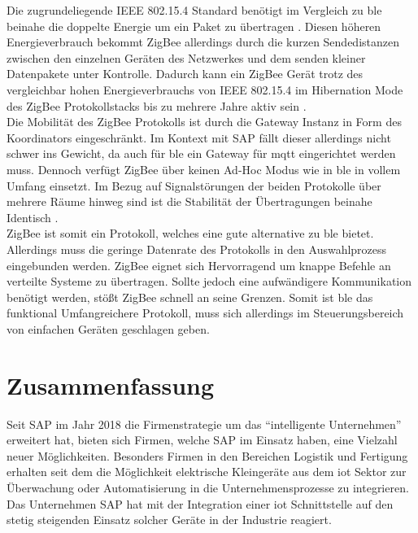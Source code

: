 \noindent Die zugrundeliegende IEEE 802.15.4 Standard benötigt im Vergleich zu \ac{ble} beinahe die doppelte Energie um ein Paket zu übertragen \cite[Seite 4]{Fafoutis16:BOI}. Diesen höheren Energieverbrauch bekommt ZigBee allerdings durch die kurzen Sendedistanzen zwischen den einzelnen Geräten des Netzwerkes und dem senden kleiner Datenpakete unter Kontrolle. Dadurch kann ein ZigBee Gerät trotz des vergleichbar hohen Energieverbrauchs von IEEE 802.15.4 im Hibernation Mode des ZigBee Protokollstacks bis zu mehrere Jahre aktiv sein \cite[Seite 267]{Gessler15:WNN}.\\

\noindent Die Mobilität des ZigBee Protokolls ist durch die Gateway Instanz in Form des Koordinators eingeschränkt. Im Kontext mit SAP fällt dieser allerdings nicht schwer ins Gewicht, da auch für \ac{ble} ein Gateway für \ac{mqtt} eingerichtet werden muss. Dennoch verfügt ZigBee über keinen Ad-Hoc Modus wie in \ac{ble} in vollem Umfang einsetzt. Im Bezug auf Signalstörungen der beiden Protokolle über mehrere Räume hinweg sind ist die Stabilität der Übertragungen beinahe Identisch \cite[Seite 6]{Fafoutis16:BOI}.\\

\noindent ZigBee ist somit ein Protokoll, welches eine gute alternative zu \ac{ble} bietet. Allerdings muss die geringe Datenrate des Protokolls in den Auswahlprozess eingebunden werden. ZigBee eignet sich Hervorragend um knappe Befehle an verteilte Systeme zu übertragen. Sollte jedoch eine aufwändigere Kommunikation benötigt werden, stößt ZigBee schnell an seine Grenzen. Somit ist \ac{ble} das funktional Umfangreichere Protokoll, muss sich allerdings im Steuerungsbereich von einfachen Geräten geschlagen geben.\\

\section{Zusammenfassung}
\label{s:fazit}

\noindent Seit SAP im Jahr 2018 die Firmenstrategie um das "`intelligente Unternehmen"' erweitert hat, bieten sich Firmen, welche SAP im Einsatz haben, eine Vielzahl neuer Möglichkeiten. Besonders Firmen in den Bereichen Logistik und Fertigung erhalten seit dem die Möglichkeit elektrische Kleingeräte aus dem \ac{iot} Sektor zur Überwachung oder Automatisierung in die Unternehmensprozesse zu integrieren. Das Unternehmen SAP hat mit der Integration einer \ac{iot} Schnittstelle auf den stetig steigenden Einsatz solcher Geräte in der Industrie reagiert.\\

